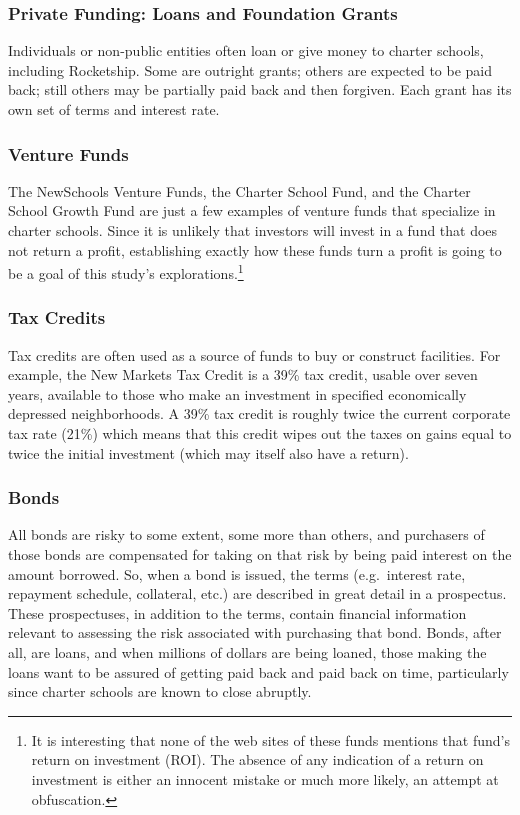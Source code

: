 \subsubsection{Private Funding: Loans and Foundation Grants}\label{sec:private-funding}\indent

Individuals or non-public entities often loan or give money to charter schools, including Rocketship. Some are outright grants; others are expected to be paid back; still others may be partially paid back and then forgiven. Each grant has its own set of terms and interest rate.

\subsubsection{Venture Funds}\label{sec:venture-funds}\indent

The NewSchools Venture Funds, the Charter School Fund, and the Charter School Growth Fund are just a few examples of venture funds that specialize in charter schools. Since it is unlikely that investors will invest in a fund that does not return a profit, establishing exactly how these funds turn a profit is going to be a goal of this study's explorations.\footnote{It is interesting that none of the web sites of these funds mentions that fund's return on investment (ROI). The absence of any indication of a return on investment is either an innocent mistake or much more likely, an attempt at obfuscation.}

\subsubsection{Tax Credits}\label{sec:tax-credits}\indent

Tax credits are often used as a source of funds to buy or construct facilities. For example, the New Markets Tax Credit is a 39\% tax credit, usable over seven years, available to those who make an investment in specified economically depressed neighborhoods. A 39\% tax credit is roughly twice the current corporate tax rate (21\%) which means that this credit wipes out the taxes on gains equal to twice the initial investment (which may itself also have a return).

\subsubsection{Bonds}\label{sec:bond-prospectuses}\indent

All bonds are risky to some extent, some more than others, and purchasers of those bonds are compensated for taking on that risk by being paid interest on the amount borrowed. So, when a bond is issued, the terms (e.g. interest rate, repayment schedule, collateral, etc.) are described in great detail in a prospectus. These prospectuses, in addition to the terms, contain financial information relevant to assessing the risk associated with purchasing that bond. Bonds, after all, are loans, and when millions of dollars are being loaned, those making the loans want to be assured of getting paid back and paid back on time, particularly since charter schools are known to close abruptly.

